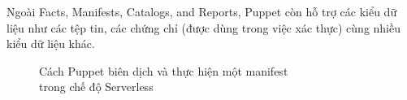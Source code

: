 Ngoài Facts, Manifests, Catalogs, and Reports, Puppet còn hỗ trợ các kiểu dữ liệu như các tệp tin, các chứng chỉ (được dùng trong việc xác thực) cùng nhiều kiểu dữ liệu khác.

\begin{figure}[h!]
    \begin{center}
    \end{center}
    \caption{Cách Puppet biên dịch và thực hiện một manifest\\ trong chế độ Serverless}
    \label{fig:puppet_manifest_to_defined_state_unified}
\end{figure}


